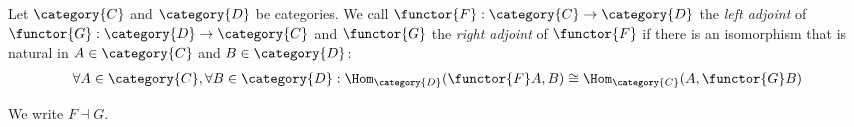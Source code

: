 \documentclass[DIN, pagenumber=false, fontsize=11pt, parskip=half, colorinlistoftodos, svgnames]{scrartcl}
\newcommand{\notimportantnote}[2][]{\todo[color=LightPink, #1]{#2}}
\begin{document}
	
	
	
	\begin{definition}[Adjunction]
		\label{def: adjunction}
		Let $\category{C}$ and $\category{D} $ be categories. We call $\functor{F}: \category{C} \rightarrow \category{D} $ the \emph{left adjoint} of $\functor{G}: \category{D} \rightarrow \category{C} $ and $\functor{G} $ the \emph{right adjoint} of $\functor{F} $ if there is an isomorphism that is natural in $A \in \category{C} $ and $B \in \category{D} $:
		\begin{align*}
			\forall A \in \category{C}, \forall B \in \category{D}:
			\Hom_\category{D}(\functor{F}A, B) 
			\cong \Hom_\category{C}(A, \functor{G}B)
		\end{align*}
		
		We write $F \dashv G$.
	\end{definition}
	
\end{document}
